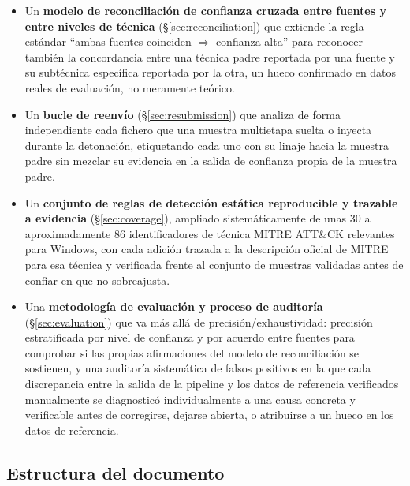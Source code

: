 \begin{itemize}
  \item Un \textbf{modelo de reconciliaci\'on de confianza cruzada entre
    fuentes y entre niveles de t\'ecnica} (\S\ref{sec:reconciliation})
    que extiende la regla est\'andar ``ambas fuentes coinciden
    $\Rightarrow$ confianza alta'' para reconocer tambi\'en la
    concordancia entre una t\'ecnica padre reportada por una fuente y su
    subt\'ecnica espec\'ifica reportada por la otra, un hueco confirmado
    en datos reales de evaluaci\'on, no meramente te\'orico.
  \item Un \textbf{bucle de reenv\'io} (\S\ref{sec:resubmission}) que
    analiza de forma independiente cada fichero que una muestra
    multietapa suelta o inyecta durante la detonaci\'on, etiquetando
    cada uno con su linaje hacia la muestra padre sin mezclar su
    evidencia en la salida de confianza propia de la muestra padre.
  \item Un \textbf{conjunto de reglas de detecci\'on est\'atica
    reproducible y trazable a evidencia} (\S\ref{sec:coverage}),
    ampliado sistem\'aticamente de unas 30 a aproximadamente 86
    identificadores de t\'ecnica MITRE ATT\&CK relevantes para Windows,
    con cada adici\'on trazada a la descripci\'on oficial de MITRE para
    esa t\'ecnica y verificada frente al conjunto de muestras validadas
    antes de confiar en que no sobreajusta.
  \item Una \textbf{metodolog\'ia de evaluaci\'on y proceso de
    auditor\'ia} (\S\ref{sec:evaluation}) que va m\'as all\'a de
    precisi\'on/exhaustividad: precisi\'on estratificada por nivel de
    confianza y por acuerdo entre fuentes para comprobar si las propias
    afirmaciones del modelo de reconciliaci\'on se sostienen, y una
    auditor\'ia sistem\'atica de falsos positivos en la que cada
    discrepancia entre la salida de la pipeline y los datos de
    referencia verificados manualmente se diagnostic\'o individualmente a
    una causa concreta y verificable antes de corregirse, dejarse
    abierta, o atribuirse a un hueco en los datos de referencia.
\end{itemize}

\subsection{Estructura del documento}

